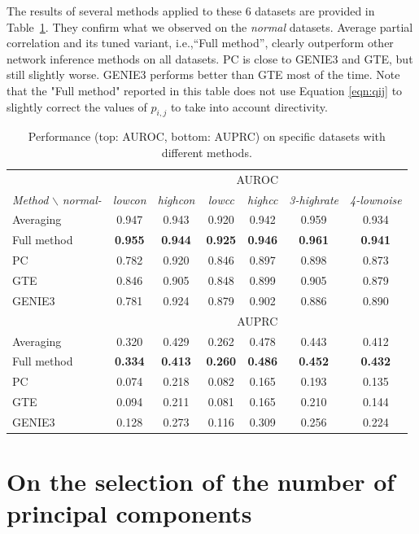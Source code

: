 \documentclass[wcp]{jmlr}
\begin{document}
The results of several methods applied to these 6 datasets are provided in
Table~\ref{tab:results_appendix}. They confirm what we observed on the
\textit{normal} datasets. Average partial correlation and its tuned variant,
i.e.,``Full method'', clearly outperform other network inference methods on all
datasets. PC is close to GENIE3 and GTE, but still slightly worse. GENIE3
performs better than GTE most of the time. Note that the "Full method" reported in this table does not use Equation \ref{eqn:qij} to slightly correct the values of $p_{i,j}$  to take into account directivity.


\begin{table}[h]
\caption{Performance (top: AUROC, bottom: AUPRC) on specific datasets with different methods.}
\label{tab:results_appendix}
\centering
\small
\begin{tabular}{| l | c c c c c c |}
\hline
& \multicolumn{6}{c|}{AUROC}\\
\textit{Method} $\backslash$ \textit{normal-} & \textit{lowcon} & \textit{highcon} & \textit{lowcc} & \textit{highcc} & \textit{3-highrate} & \textit{4-lownoise} \\
\hline
\hline
Averaging     & 0.947 & 0.943 & 0.920 & 0.942 & 0.959 & 0.934 \\
Full method   & \textbf{0.955} & \textbf{0.944} &  \textbf{0.925} & \textbf{0.946} & \textbf{0.961} & \textbf{0.941} \\
PC & 0.782 & 0.920 &  0.846 & 0.897  & 0.898  & 0.873 \\
GTE & 0.846 & 0.905 & 0.848 & 0.899 & 0.905 & 0.879\\
GENIE3 & 0.781 &  0.924 & 0.879 & 0.902 & 0.886 &  0.890 \\ \hline \hline
& \multicolumn{6}{c|}{AUPRC}\\ \hline
Averaging     & 0.320 & 0.429 & 0.262 & 0.478 & 0.443 & 0.412 \\
Full method   & \textbf{0.334} & \textbf{0.413} &  \textbf{0.260} & \textbf{0.486} & \textbf{0.452} & \textbf{0.432}\\
PC & 0.074 & 0.218 & 0.082 & 0.165  & 0.193 & 0.135 \\
GTE & 0.094 & 0.211 & 0.081 & 0.165 & 0.210 & 0.144\\
GENIE3 & 0.128 & 0.273 & 0.116 & 0.309 & 0.256 & 0.224\\ \hline
\end{tabular}
\end{table}

\section{On the selection of the number of principal components}
\label{app:pca}
\end{document}
